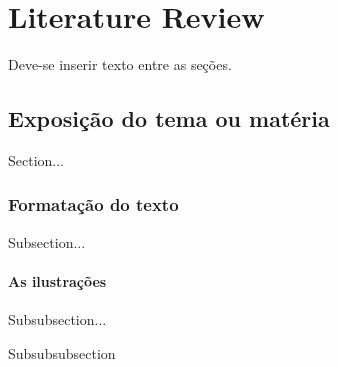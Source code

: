 \chapter{Literature Review}\label{cap:literatureReview}
Deve-se inserir texto entre as seções.

\section{Exposição do tema ou matéria}

Section...

\subsection{Formatação do texto}

Subsection...

\subsubsection{As ilustrações}

Subsubsection...


Subsubsubsection